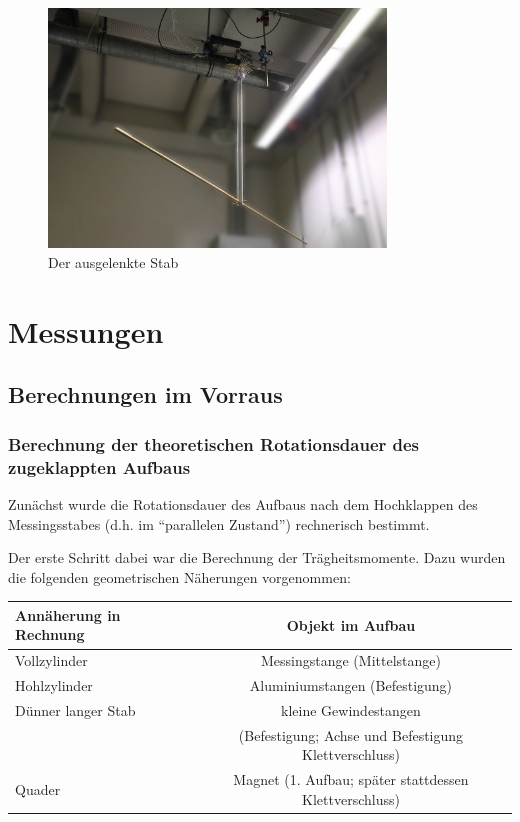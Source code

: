 \documentclass[11pt]{scrartcl}
\begin{document}
\begin{figure}[ht]
\begin{center}
\includegraphics[width=0.8\textwidth]{stab-fertig.jpg}
\end{center}
\vspace{-1.5\baselineskip}
\caption{Der ausgelenkte Stab}
\label{stab-fertig}
\end{figure}

\section{Messungen}
\subsection{Berechnungen im Vorraus} %

\subsubsection{Berechnung der theoretischen Rotationsdauer des zugeklappten Aufbaus}

Zun\"achst wurde die Rotationsdauer des Aufbaus nach dem Hochklappen des Messingsstabes (d.h. im "`parallelen Zustand"') rechnerisch bestimmt. 

Der erste Schritt dabei war die Berechnung der Tr\"agheitsmomente. Dazu wurden die folgenden geometrischen N\"aherungen vorgenommen:

\begin{tabular}[ht]{|l|c|}
  \hline
  Ann\"aherung in Rechnung & Objekt im Aufbau\\
  \hline\hline
	Vollzylinder & Messingstange (Mittelstange)\\
	Hohlzylinder & Aluminiumstangen (Befestigung)\\
	D\"unner langer Stab & kleine Gewindestangen \\
	  & (Befestigung; Achse und Befestigung Klettverschluss)\\
	Quader & Magnet (1. Aufbau; sp\"ater stattdessen Klettverschluss)\\
  \hline
\end{tabular}
\end{document}
